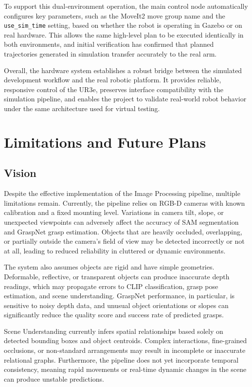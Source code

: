 \documentclass[12pt]{extarticle}
\begin{document}
To support this dual-environment operation, the main control node automatically configures key parameters, such as the MoveIt2 move group name and the \texttt{use\_sim\_time} setting, based on whether the robot is operating in Gazebo or on real hardware. This allows the same high-level plan to be executed identically in both environments, and initial verification has confirmed that planned trajectories generated in simulation transfer accurately to the real arm.

Overall, the hardware system establishes a robust bridge between the simulated development workflow and the real robotic platform. It provides reliable, responsive control of the UR3e, preserves interface compatibility with the simulation pipeline, and enables the project to validate real-world robot behavior under the same architecture used for virtual testing.


\newpage
\section{Limitations and Future Plans}

\subsection{Vision}

Despite the effective implementation of the Image Processing pipeline, multiple limitations remain.
Currently, the pipeline relies on RGB-D cameras with known calibration and a fixed mounting level. Variations in camera tilt, slope, or unexpected viewpoints can adversely affect the accuracy of SAM segmentation and GraspNet grasp estimation. Objects that are heavily occluded, overlapping, or partially outside the camera's field of view may be detected incorrectly or not at all, leading to reduced reliability in cluttered or dynamic environments. 

The system also assumes objects are rigid and have simple geometries. Deformable, reflective, or transparent objects can produce inaccurate depth readings, which may propagate errors to CLIP classification, grasp pose estimation, and scene understanding. GraspNet performance, in particular, is sensitive to noisy depth data, and unusual object orientations or slopes can significantly reduce the quality score and success rate of predicted grasps. 

Scene Understanding currently infers spatial relationships based solely on detected bounding boxes and object centroids. Complex interactions, fine-grained occlusions, or non-standard arrangements may result in incomplete or inaccurate relational graphs. Furthermore, the pipeline does not yet incorporate temporal consistency, meaning rapid movements or real-time dynamic changes in the scene can produce unstable predictions. 
\end{document}
